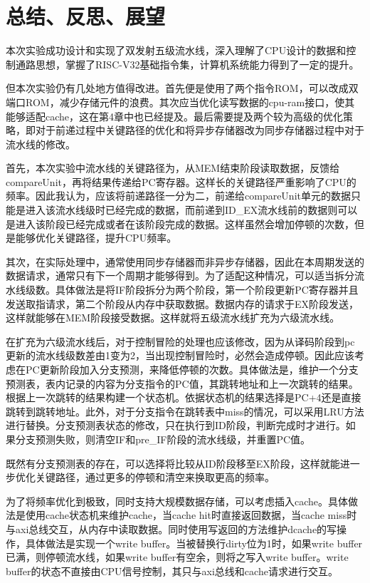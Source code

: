 \documentclass{article}
\begin{document}
    \section{总结、反思、展望}
        \par{}
        本次实验成功设计和实现了双发射五级流水线，深入理解了CPU设计的数据和控制通路思想，掌握了RISC-V32基础指令集，计算机系统能力得到了一定的提升。
        \par{}
        但本次实验仍有几处地方值得改进。首先便是使用了两个指令ROM，可以改成双端口ROM，减少存储元件的浪费。其次应当优化读写数据的cpu-ram接口，使其能够适配cache，这在第4章中也已经提及。最后需要提及两个较为高级的优化策略，即对于前递过程中关键路径的优化和将异步存储器改为同步存储器过程中对于流水线的修改。
        \par{}
        首先，本次实验中流水线的关键路径为，从MEM结束阶段读取数据，反馈给compareUnit，再将结果传递给PC寄存器。这样长的关键路径严重影响了CPU的频率。因此我认为，应该将前递路径一分为二，前递给compareUnit单元的数据只能是进入该流水线级时已经完成的数据，而前递到ID\_EX流水线前的数据则可以是进入该阶段已经完成或者在该阶段完成的数据。这样虽然会增加停顿的次数，但是能够优化关键路径，提升CPU频率。
        \par{}
        其次，在实际处理中，通常使用同步存储器而非异步存储器，因此在本周期发送的数据请求，通常只有下一个周期才能够得到。为了适配这种情况，可以适当拆分流水线级数。具体做法是将IF阶段拆分为两个阶段，第一个阶段更新PC寄存器并且发送取指请求，第二个阶段从内存中获取数据。数据内存的请求于EX阶段发送，这样就能够在MEM阶段接受数据。这样就将五级流水线扩充为六级流水线。
        \par{}
        在扩充为六级流水线后，对于控制冒险的处理也应该修改，因为从译码阶段到pc更新的流水线级数差由1变为2，当出现控制冒险时，必然会造成停顿。因此应该考虑在PC更新阶段加入分支预测，来降低停顿的次数。具体做法是，维护一个分支预测表，表内记录的内容为分支指令的PC值，其跳转地址和上一次跳转的结果。根据上一次跳转的结果构建一个状态机。依据状态机的结果选择是PC+4还是直接跳转到跳转地址。此外，对于分支指令在跳转表中miss的情况，可以采用LRU方法进行替换。分支预测表状态的修改，只在执行到ID阶段，判断完成时才进行。如果分支预测失败，则清空IF和pre\_IF阶段的流水线级，并重置PC值。
        \par{}
        既然有分支预测表的存在，可以选择将比较从ID阶段移至EX阶段，这样就能进一步优化关键路径，通过更多的停顿和清空来换取更高的频率。
        \par{}
        为了将频率优化到极致，同时支持大规模数据存储，可以考虑插入cache。具体做法是使用cache状态机来维护cache，当cache hit时直接返回数据，当cache miss时与axi总线交互，从内存中读取数据。同时使用写返回的方法维护dcache的写操作，具体做法是实现一个write buffer。当被替换行dirty位为1时，如果write buffer已满，则停顿流水线，如果write buffer有空余，则将之写入write buffer。write buffer的状态不直接由CPU信号控制，其只与axi总线和cache请求进行交互。
\end{document}
